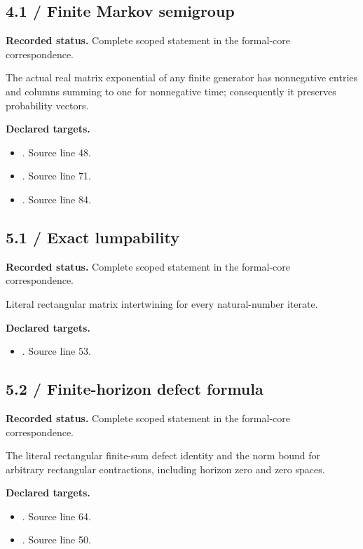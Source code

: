 \subsection{4.1 / Finite Markov semigroup}
\label{result:4.1}
\textbf{Recorded status.} Complete scoped statement in the formal-core correspondence.\par
The actual real matrix exponential of any finite generator has nonnegative entries and columns summing to one for nonnegative time; consequently it preserves probability vectors.

\textbf{Declared targets.}\begin{itemize}
\item {}. Source line 48.
\item {}. Source line 71.
\item {}. Source line 84.
\end{itemize}
\subsection{5.1 / Exact lumpability}
\label{result:5.1}
\textbf{Recorded status.} Complete scoped statement in the formal-core correspondence.\par
Literal rectangular matrix intertwining for every natural-number iterate.

\textbf{Declared targets.}\begin{itemize}
\item {}. Source line 53.
\end{itemize}
\subsection{5.2 / Finite-horizon defect formula}
\label{result:5.2}
\textbf{Recorded status.} Complete scoped statement in the formal-core correspondence.\par
The literal rectangular finite-sum defect identity and the norm bound for arbitrary rectangular contractions, including horizon zero and zero spaces.

\textbf{Declared targets.}\begin{itemize}
\item {}. Source line 64.
\item {}. Source line 50.
\end{itemize}
